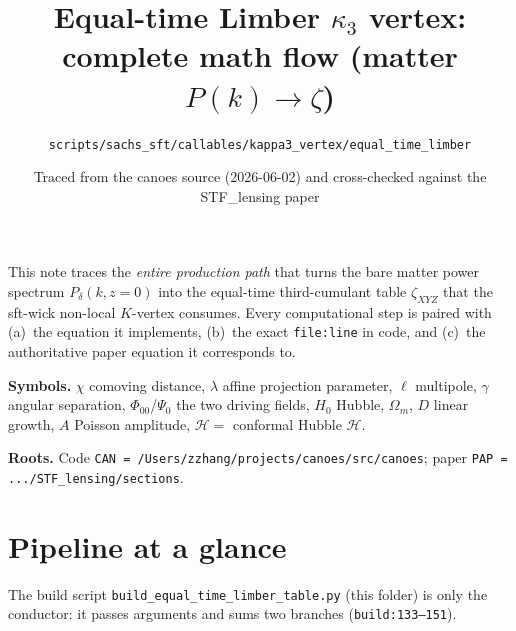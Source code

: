 \documentclass[11pt]{article}
\title{\textbf{Equal-time Limber $\kappa_3$ vertex:\\ complete math flow (matter $P(k)\to\zeta$)}}
\author{\texttt{scripts/sachs\_sft/callables/kappa3\_vertex/equal\_time\_limber}}
\date{Traced from the canoes source (2026-06-02) and cross-checked against the STF\_lensing paper}
\newcommand{\code}[1]{\texttt{\footnotesize #1}}
\newcommand{\chh}{\chi}
\newcommand{\lam}{\lambda}
\newcommand{\Phizero}{\Phi_{00}}
\newcommand{\Psizero}{\Psi_{0}}
\newcommand{\Dgrow}{D}
\newcommand{\Hcal}{\mathcal{H}}
\begin{document}
\maketitle

\noindent
This note traces the \emph{entire production path} that turns the bare matter power
spectrum $P_\delta(k,z{=}0)$ into the equal-time third-cumulant table $\zeta_{XYZ}$
that the sft-wick non-local $K$-vertex consumes. Every computational step is paired
with (a)~the equation it implements, (b)~the exact \code{file:line} in code, and
(c)~the authoritative paper equation it corresponds to.

\medskip
\noindent\textbf{Symbols.}
$\chh$ comoving distance, $\lam$ affine projection parameter, $\ell$ multipole,
$\gamma$ angular separation, $\Phizero$/$\Psizero$ the two driving fields,
$H_0$ Hubble, $\Omega_m$, $\Dgrow$ linear growth, $A$ Poisson amplitude,
$\Hcal=$ conformal Hubble $\mathcal H$.

\smallskip
\noindent\textbf{Roots.}
Code \code{CAN = /Users/zzhang/projects/canoes/src/canoes};\quad
paper \code{PAP = .../STF\_lensing/sections}.

\tableofcontents

\section{Pipeline at a glance}
The build script
\code{build\_equal\_time\_limber\_table.py} (this folder) is only the conductor:
it passes arguments and sums two branches
(\code{build:133--151}).
\end{document}
